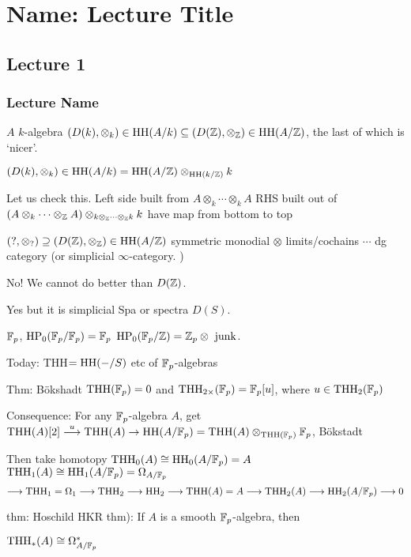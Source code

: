 \newpage
\section{Name: Lecture Title}
\subsection{Lecture 1}
\subsubsection{Lecture Name}


$A$ $k$-algebra
$(D(k), \otimes_k) \in \hh(A/k) \subseteq (D(\Z), \otimes_\Z) \in \hh(A/\Z)$, the last of which is `nicer'. 

$(D(k), \otimes_k) \in \hh(A/k)= \hh(A/\Z) \otimes_{\hh(k/\Z)} k$

Let us check this. Left side built from $A \otimes_k \cdots \otimes_k A$
RHS built out of $(A \otimes_k \cdots \otimes_\Z A) \otimes_{k \otimes_\Z \cdots \otimes_\Z k} k$ have map from bottom to top


$(?,\otimes_?) \supseteq (D(\Z), \otimes_\Z) \in \hh(A/\Z) $
symmetric monodial $\otimes$
limits/cochains
$\cdots$
dg category (or simplicial $\infty$-category. )


No! We cannot do better than $D(\Z)$. 


Yes but it is simplicial Spa or spectra $D(S)$.

$\F_p$, $\hp_0(\F_p/\F_p)= \F_p$
$\hp_0(\F_p/\Z)= \Z_p \otimes \text{ junk}$. 


Today: THH$=\hh(-/S)$ etc of $\F_p$-algebras


Thm: B\"okshadt
$\thh(\F_p)=0$ and $\thh_{2 \times}(\F_p)= \F_p[u]$, where $u \in \thh_2(\F_p)$


Consequence: For any $\F_p$-algebra $A$, get $\thh(A)[2] \ma{u} \thh(A) \to \hh(A/\F_p)= \thh(A) \otimes_{\thh(\F_p)} \F_p$, B\"okstadt

Then take homotopy 
$\thh_0(A) \cong \hh_0(A/\F_p)= A$
$\thh_1(A) \cong \hh_1(A/\F_p)= \Omega_{A/\F_p}$
	\[
	\ma{} \thh_1=\Omega_1 \ma{} \thh_2 \ma{} \hh_2 \ma{} \thh(A)=A \ma{} \thh_2(A) \ma{} \hh_2(A/\F_p) \ma{} 0
	\]


thm: Hoschild HKR thm): If $A$ is a smooth $\F_p$-algebra, then 

$\thh_*(A) \cong \Omega_{A/\F_p}^*$






























